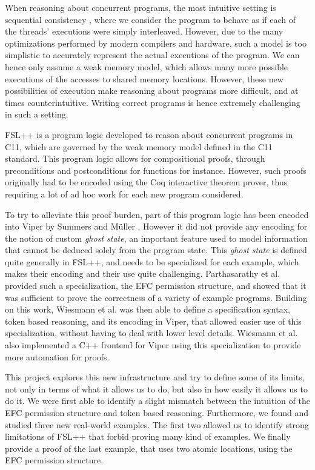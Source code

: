 When reasoning about concurrent programs, the most intuitive setting is sequential consistency \cite{LamportSC}, where we consider the program to behave as if each of the threads' executions were simply interleaved. However, due to the many optimizations performed by modern compilers and hardware, such a model is too simplistic to accurately represent the actual executions of the program. We can hence only assume a weak memory model, which allows many more possible executions of the accesses to shared memory locations. However, these new possibilities of execution make reasoning about programs more difficult, and at times counterintuitive. Writing correct programs is hence extremely challenging in such a setting.

FSL++ \cite{fsl} is a program logic developed to reason about concurrent programs in C11, which are governed by the weak memory model defined in the C11 standard. This program logic allows for compositional proofs, through preconditions and postconditions for functions for instance. However, such proofs originally had to be encoded using the Coq interactive theorem prover, thus requiring a lot of ad hoc work for each new program considered.


To try to alleviate this proof burden, part of this program logic has been encoded into Viper \cite{viper} by Summers and M\"uller \cite{rslViper}. However it did not provide any encoding for the notion of custom \emph{ghost state}, an important feature used to model information that cannot be deduced solely from the program state. This \emph{ghost state} is defined quite generally in FSL++, and needs to be specialized for each example, which makes their encoding and their use quite challenging. Parthasarathy et al. \cite{gaurav} provided such a specialization, the EFC permission structure, and showed that it was sufficient to prove the correctness of a variety of example programs. Building on this work, Wiesmann et al. \cite{pascal} was then able to define a specification syntax, token based reasoning, and its encoding in Viper, that allowed easier use of this specialization, without having to deal with lower level details. Wiesmann et al. \cite{pascal} also implemented a C++ frontend for Viper using this specialization to provide more automation for proofs.  

This project explores this new infrastructure and try to define some of its limits, not only in terms of what it allows us to do, but also in how easily it allows us to do it. We were first able to identify a slight mismatch between the intuition of the EFC permission structure and token based reasoning. Furthermore, we found and studied three new real-world examples. The first two allowed us to identify strong limitations of FSL++ that forbid proving many kind of examples. We finally provide a proof of the last example, that uses two atomic locations, using the EFC permission structure. 
